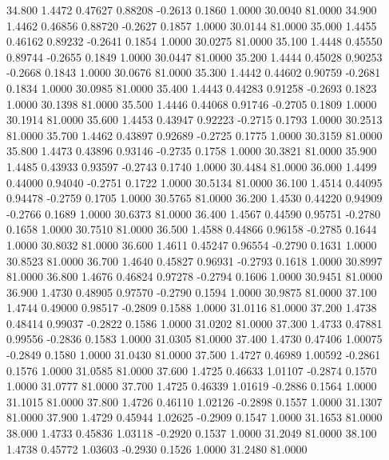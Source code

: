   34.800   1.4472   0.47627   0.88208  -0.2613   0.1860   1.0000  30.0040  81.0000
  34.900   1.4462   0.46856   0.88720  -0.2627   0.1857   1.0000  30.0144  81.0000
  35.000   1.4455   0.46162   0.89232  -0.2641   0.1854   1.0000  30.0275  81.0000
  35.100   1.4448   0.45550   0.89744  -0.2655   0.1849   1.0000  30.0447  81.0000
  35.200   1.4444   0.45028   0.90253  -0.2668   0.1843   1.0000  30.0676  81.0000
  35.300   1.4442   0.44602   0.90759  -0.2681   0.1834   1.0000  30.0985  81.0000
  35.400   1.4443   0.44283   0.91258  -0.2693   0.1823   1.0000  30.1398  81.0000
  35.500   1.4446   0.44068   0.91746  -0.2705   0.1809   1.0000  30.1914  81.0000
  35.600   1.4453   0.43947   0.92223  -0.2715   0.1793   1.0000  30.2513  81.0000
  35.700   1.4462   0.43897   0.92689  -0.2725   0.1775   1.0000  30.3159  81.0000
  35.800   1.4473   0.43896   0.93146  -0.2735   0.1758   1.0000  30.3821  81.0000
  35.900   1.4485   0.43933   0.93597  -0.2743   0.1740   1.0000  30.4484  81.0000
  36.000   1.4499   0.44000   0.94040  -0.2751   0.1722   1.0000  30.5134  81.0000
  36.100   1.4514   0.44095   0.94478  -0.2759   0.1705   1.0000  30.5765  81.0000
  36.200   1.4530   0.44220   0.94909  -0.2766   0.1689   1.0000  30.6373  81.0000
  36.400   1.4567   0.44590   0.95751  -0.2780   0.1658   1.0000  30.7510  81.0000
  36.500   1.4588   0.44866   0.96158  -0.2785   0.1644   1.0000  30.8032  81.0000
  36.600   1.4611   0.45247   0.96554  -0.2790   0.1631   1.0000  30.8523  81.0000
  36.700   1.4640   0.45827   0.96931  -0.2793   0.1618   1.0000  30.8997  81.0000
  36.800   1.4676   0.46824   0.97278  -0.2794   0.1606   1.0000  30.9451  81.0000
  36.900   1.4730   0.48905   0.97570  -0.2790   0.1594   1.0000  30.9875  81.0000
  37.100   1.4744   0.49000   0.98517  -0.2809   0.1588   1.0000  31.0116  81.0000
  37.200   1.4738   0.48414   0.99037  -0.2822   0.1586   1.0000  31.0202  81.0000
  37.300   1.4733   0.47881   0.99556  -0.2836   0.1583   1.0000  31.0305  81.0000
  37.400   1.4730   0.47406   1.00075  -0.2849   0.1580   1.0000  31.0430  81.0000
  37.500   1.4727   0.46989   1.00592  -0.2861   0.1576   1.0000  31.0585  81.0000
  37.600   1.4725   0.46633   1.01107  -0.2874   0.1570   1.0000  31.0777  81.0000
  37.700   1.4725   0.46339   1.01619  -0.2886   0.1564   1.0000  31.1015  81.0000
  37.800   1.4726   0.46110   1.02126  -0.2898   0.1557   1.0000  31.1307  81.0000
  37.900   1.4729   0.45944   1.02625  -0.2909   0.1547   1.0000  31.1653  81.0000
  38.000   1.4733   0.45836   1.03118  -0.2920   0.1537   1.0000  31.2049  81.0000
  38.100   1.4738   0.45772   1.03603  -0.2930   0.1526   1.0000  31.2480  81.0000
